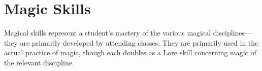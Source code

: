 


\section{Magic Skills}

Magical skills represent a student's mastery of the various magical disciplines---they are primarily developed by attending classes.
They are primarily used in the actual practice of magic, though each doubles as a Lore skill concerning magic of the relevant discipline. %
